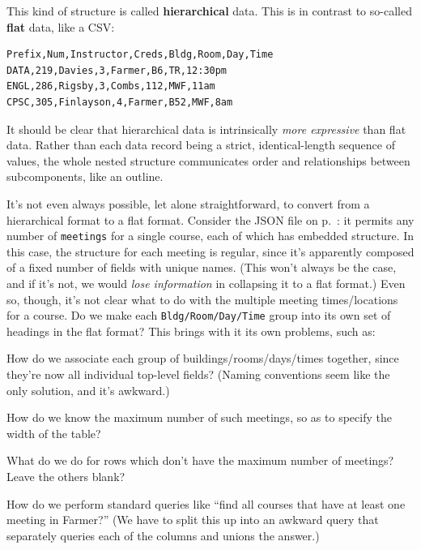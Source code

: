 \normalsize

\pagebreak

This kind of structure is called \textbf{hierarchical} data. This is in
contrast to so-called \textbf{flat} data, like a CSV:

\begin{Verbatim}[fontsize=\normalsize,samepage=true,frame=lines,framesep=3mm]
Prefix,Num,Instructor,Creds,Bldg,Room,Day,Time
DATA,219,Davies,3,Farmer,B6,TR,12:30pm
ENGL,286,Rigsby,3,Combs,112,MWF,11am
CPSC,305,Finlayson,4,Farmer,B52,MWF,8am
\end{Verbatim}

It should be clear that hierarchical data is intrinsically \textit{more
expressive} than flat data. Rather than each data record being a strict,
identical-length sequence of values, the whole nested structure communicates
order and relationships between subcomponents, like an outline.

It's not even always possible, let alone straightforward, to convert from a
hierarchical format to a flat format. Consider the JSON file on
p.~\pageref{coursesJson}: it permits any number of \texttt{meetings} for a
single course, each of which has embedded structure. In this case, the
structure for each meeting is regular, since it's apparently composed of a
fixed number of fields with unique names. (This won't always be the case, and
if it's not, we would \textit{lose information} in collapsing it to a flat
format.) Even so, though, it's not clear what to do with the multiple meeting
times/locations for a course. Do we make each \texttt{Bldg/Room/Day/Time} group
into its own set of headings in the flat format? This brings with it its own
problems, such as:

\begin{compactenum}
\item How do we associate each group of buildings/rooms/days/times together,
since they're now all individual top-level fields? (Naming conventions seem
like the only solution, and it's awkward.)
\item How do we know the maximum number of such meetings, so as to specify the
width of the table?
\item What do we do for rows which don't have the maximum number of meetings?
Leave the others blank?
\item How do we perform standard queries like ``find all courses that have at
least one meeting in Farmer?'' (We have to split this up into an awkward query
that separately queries each of the columns and unions the answer.)
\end{compactenum}

